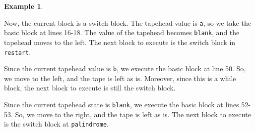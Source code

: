 \documentclass{article}
\theoremstyle{definition}
\newtheorem{example}[rules]{Example}
\theoremstyle{plain}
\begin{document}
\begin{example}
\begin{figure}[H]
    \end{figure}
    \noindent Now, the current block is a switch block. The tapehead value is \texttt{a}, so we take the basic block at lines 16-18. The value of the tapehead becomes \texttt{blank}, and the tapehead moves to the left. The next block to execute is the switch block in \texttt{restart}.
    \begin{figure}[H]
        \centering
    \end{figure}
    \noindent Since the current tapehead value is \texttt{b}, we execute the basic block at line 50. So, we move to the left, and the tape is left as is. Moreover, since this is a while block, the next block to execute is still the switch block.
    \begin{figure}[H]
        \centering
    \end{figure}
    \noindent Since the current tapehead state is \texttt{blank}, we execute the basic block at lines 52-53. So, we move to the right, and the tape is left as is. The next block to execute is the switch block at \texttt{palindrome}.
    \begin{figure}[H]
        \centering
\end{figure}
\end{example}
\end{document}
